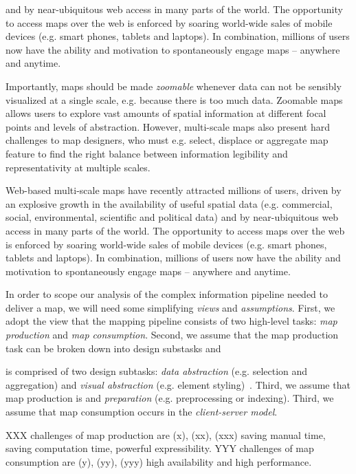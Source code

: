 \documentclass[11pt, oneside]{report}   	%
\begin{document}
 and by near-ubiquitous web access in many parts of the world. The opportunity to access maps over the web is enforced by soaring world-wide sales of mobile devices (e.g. smart phones, tablets and laptops). In combination, millions of users now have the ability and motivation to spontaneously engage maps -- anywhere and anytime.


Importantly, maps should be made \emph{zoomable} whenever data can not be sensibly visualized at a single scale, e.g. because there is too much data. Zoomable maps allows users to explore vast amounts of spatial information at different focal points and levels of abstraction. However, multi-scale maps also present hard challenges to map designers, who must e.g. select, displace or aggregate map feature to find the right balance between information legibility and representativity at multiple scales.

Web-based multi-scale maps have recently attracted millions of users, driven by an explosive growth in the availability of useful spatial data (e.g. commercial, social, environmental, scientific and political data) and by near-ubiquitous web access in many parts of the world. The opportunity to access maps over the web is enforced by soaring world-wide sales of mobile devices (e.g. smart phones, tablets and laptops). In combination, millions of users now have the ability and motivation to spontaneously engage maps -- anywhere and anytime.


In order to scope our analysis of the complex information pipeline needed to deliver a map, we will need some simplifying \emph{views} and \emph{assumptions}. First, we adopt the view that the mapping pipeline consists of two high-level tasks: \emph{map production} and \emph{map consumption}. Second, we assume that the map production task can be broken down into design substasks  and 

is comprised of two design subtasks: \emph{data abstraction} (e.g. selection and aggregation) and \emph{visual abstraction} (e.g. element styling)~\cite{stolte2003multiscale,jacques1967semiologie}. Third, we assume that map production is  and \emph{preparation} (e.g. preprocessing or indexing). Third, we assume that map consumption occurs in the \emph{client-server model}.

XXX challenges of map production are (x), (xx), (xxx) saving manual time, saving computation time, powerful expressibility. YYY challenges of map consumption are (y), (yy), (yyy) high availability and high performance.
\end{document}
